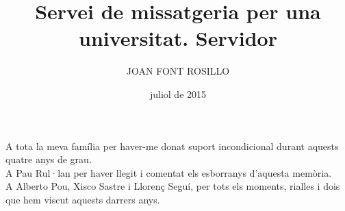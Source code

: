\documentclass[catalan,GINF]{TFGEPSUIB}
\title{Servei de missatgeria per una universitat. Servidor}
\author{\MakeUppercase{Joan Font Rosillo}}
\date{juliol de 2015}
\begin{document}
\portada
\frontmatter

\cleartorecto \thispagestyle{empty}
\begin{agraiments}
A tota la meva família per haver-me donat suport incondicional durant aquests quatre anys de grau.\\
A Pau Rul·lan per haver llegit i comentat els esborranys d'aquesta memòria.\\
A Alberto Pou, Xisco Sastre i Llorenç Seguí, per tots els moments, rialles i dois que hem viscut aquests darrers anys.\\
\end{agraiments}

\cleartorecto \tableofcontents
\cleartorecto \listoffigures
\cleartorecto \listoftables 

 

 
\mainmatter\pagestyle{ruled}








\appendix 



\backmatter




\end{document}
